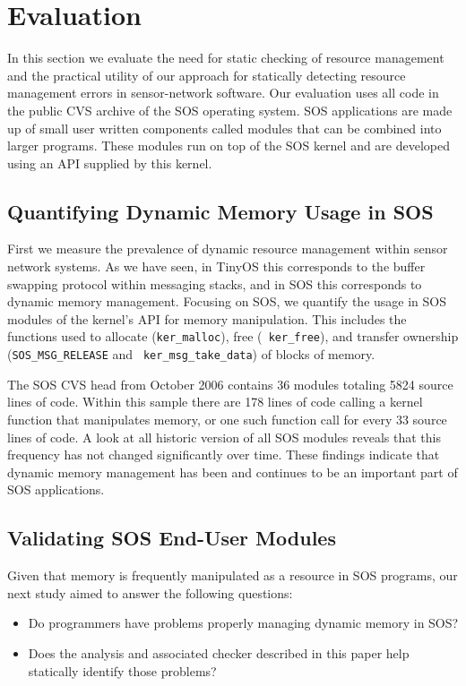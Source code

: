 \section{Evaluation}
\label{sec:eval}

In this section we evaluate the need for static checking of resource
management and the practical utility of our
approach for statically detecting resource management errors in
sensor-network software.  Our evaluation uses all code in the
public CVS archive of the SOS operating system.
SOS applications are made up of small user written components called
modules that can be combined into larger programs.  These modules
run on top of the SOS kernel and are developed using an API
supplied by this kernel.


\subsection{Quantifying Dynamic Memory Usage in SOS}

First we measure the prevalence of dynamic resource management within
sensor network systems.  As we have seen, in TinyOS this 
corresponds to the buffer swapping protocol
within messaging stacks, and in SOS
this corresponds to dynamic memory management.
Focusing on SOS, we quantify the usage in SOS modules of the kernel's API for
memory manipulation.
This includes the 
functions used to allocate ({\tt ker\_malloc}), free ({\tt
  ker\_free}), 
and transfer ownership ({\tt SOS\_MSG\_RELEASE} and {\tt
  ker\_msg\_take\_data}) of blocks
of memory.


The SOS CVS head from October 2006 contains 36 modules totaling 5824 source 
lines of code.  Within this sample there are 178 lines of code
calling a kernel function that manipulates memory, or one such function call
for every 33 source lines of code.  A look at all historic version of all
SOS modules reveals that this frequency has not changed significantly
over time.  These findings indicate that dynamic memory management has been
and continues to be an important part of SOS applications.


\subsection{Validating SOS End-User Modules}

Given that
memory is frequently manipulated as a resource in SOS programs, our
next study aimed to answer the following questions:
%
\begin{itemize}
%
\item Do programmers have problems properly managing dynamic memory in SOS?
%
\item Does the analysis and associated checker described in this paper
  help statically identify
those problems?
%
\end{itemize}

